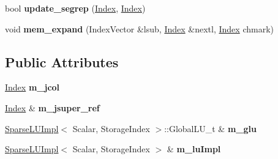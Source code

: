 \begin{DoxyCompactItemize}
\item 
\mbox{\label{struct_eigen_1_1internal_1_1column__dfs__traits_a034a1bf7ad2d7a4ba7e8c91463dc3f36}} 
bool {\bfseries update\+\_\+segrep} (\hyperlink{namespace_eigen_a62e77e0933482dafde8fe197d9a2cfde}{Index}, \hyperlink{namespace_eigen_a62e77e0933482dafde8fe197d9a2cfde}{Index})
\item 
\mbox{\label{struct_eigen_1_1internal_1_1column__dfs__traits_a5b48ce6fa5fa373fd784033df70959ff}} 
void {\bfseries mem\+\_\+expand} (Index\+Vector \&lsub, \hyperlink{namespace_eigen_a62e77e0933482dafde8fe197d9a2cfde}{Index} \&nextl, \hyperlink{namespace_eigen_a62e77e0933482dafde8fe197d9a2cfde}{Index} chmark)
\end{DoxyCompactItemize}
\subsection*{Public Attributes}
\begin{DoxyCompactItemize}
\item 
\mbox{\label{struct_eigen_1_1internal_1_1column__dfs__traits_aeb425429d726efde9a63eea217549a0d}} 
\hyperlink{namespace_eigen_a62e77e0933482dafde8fe197d9a2cfde}{Index} {\bfseries m\+\_\+jcol}
\item 
\mbox{\label{struct_eigen_1_1internal_1_1column__dfs__traits_a72fd314a7fbc79db3ed57cd38dc945ef}} 
\hyperlink{namespace_eigen_a62e77e0933482dafde8fe197d9a2cfde}{Index} \& {\bfseries m\+\_\+jsuper\+\_\+ref}
\item 
\mbox{\label{struct_eigen_1_1internal_1_1column__dfs__traits_ab524e87d049a3ab9261899266b4c9f97}} 
\hyperlink{group___sparse_l_u___module_class_eigen_1_1internal_1_1_sparse_l_u_impl}{Sparse\+L\+U\+Impl}$<$ Scalar, Storage\+Index $>$\+::Global\+L\+U\+\_\+t \& {\bfseries m\+\_\+glu}
\item 
\mbox{\label{struct_eigen_1_1internal_1_1column__dfs__traits_a33d94abe86ef0900fc5298dae4590fb9}} 
\hyperlink{group___sparse_l_u___module_class_eigen_1_1internal_1_1_sparse_l_u_impl}{Sparse\+L\+U\+Impl}$<$ Scalar, Storage\+Index $>$ \& {\bfseries m\+\_\+lu\+Impl}
\end{DoxyCompactItemize}



